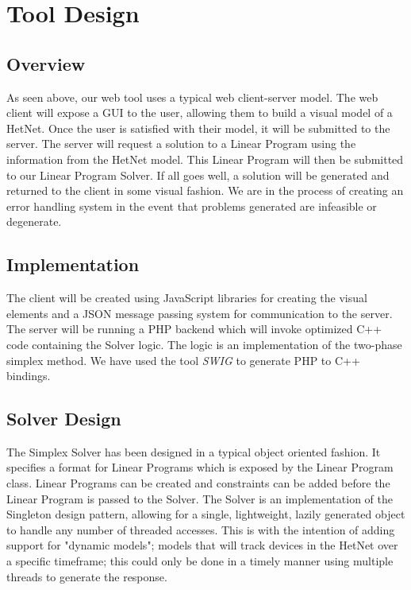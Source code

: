 \documentclass[11pt]{article}
\begin{document}
\section{Tool Design}
\subsection{Overview}
As seen above, our web tool uses a typical web client-server model. The web client
will expose a GUI to the user, allowing them to build a visual model of a 
HetNet. Once the user is satisfied with their model, it will be submitted to the 
server. The server will request a solution to a Linear Program using the information 
from the HetNet model. This Linear Program will then be submitted to our Linear
Program Solver. If all goes well, a solution will be generated and returned to 
the client in some visual fashion. We are in the process of creating an 
error handling system in the event that problems generated are infeasible or 
degenerate. 

\subsection{Implementation}
The client will be created using JavaScript libraries for creating the visual 
elements and a JSON message passing system for communication to the server.
The server will be running a PHP backend which will invoke optimized
C++ code containing the Solver logic. The logic is an implementation of the two-phase
simplex method. We have used the tool \textit{SWIG} to generate  %
PHP to C++ bindings. 

\subsection{Solver Design}
The Simplex Solver has been designed in a typical object oriented fashion. 
It specifies a format for Linear Programs which is exposed by the Linear Program
class. Linear Programs can be created and constraints can be added before 
the Linear Program is passed to the Solver. The Solver is an implementation of 
the Singleton design pattern, allowing for a single, lightweight, lazily generated 
object to handle any number of threaded accesses. This is with the intention of 
adding support for "dynamic models"; models that will track devices in the HetNet
over a specific timeframe; this could only be done in a timely manner using 
multiple threads to generate the response. 
\end{document}
